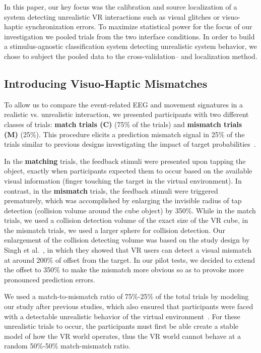 \textcolor{n}{In this paper, our key focus was the calibration and source localization of a system detecting unrealistic VR interactions such as visual glitches or visuo-haptic synchronization errors. To maximize statistical power for the focus of our investigation we pooled trials from the two interface conditions. In order to build a stimulus-agnostic classification system detecting unrealistic system behavior, we chose to subject the pooled data to the cross-validation-- and localization method.}

\subsection{Introducing Visuo-Haptic Mismatches}
To allow us to compare the event-related EEG and movement signatures in a realistic vs. unrealistic interaction, we presented participants with two different classes of trials: \textbf{match trials (C)} (75\% of the trials) and \textbf{mismatch trials (M)} (25\%). This procedure elicits a prediction mismatch signal in 25\% of the trials similar to previous designs investigating the impact of target probabilities~\cite{Polich2007-cf}.  %

In the \textbf{matching} trials, the feedback stimuli were presented upon tapping the object, exactly when participants expected them to occur based on the available visual information (finger touching the target in the virtual environment). In contrast, in the \textbf{mismatch} trials, the feedback stimuli were triggered prematurely, which was accomplished by enlarging the invisible radius of tap detection \textcolor{n}{(collision volume around the cube object)} by 350\%. While in the match trials, we used a collision detection volume of the exact size of the VR cube, in the mismatch trials, we used a larger sphere for collision detection. Our enlargement of the collision detecting volume was based on the study design by Singh et al.~\cite{Singh2018-qi}, in which they showed that VR users can detect a visual mismatch at around 200\% of offset from the target. In our pilot tests, we decided to extend the offset to 350\% to make the mismatch more obvious so as to provoke more pronounced prediction errors. 

We used a match-to-mismatch ratio of 75\%-25\% of the total trials by modeling our study after previous studies, which also ensured that participants were faced with a detectable unrealistic behavior of the virtual environment~\cite{Liao2011-po,Wiersema2007-jf,Donchin1988-gq}. For these unrealistic trials to occur, the participants must first be able create a stable model of how the VR world operates, thus the VR world cannot behave at a random 50\%-50\% match-mismatch ratio. 

